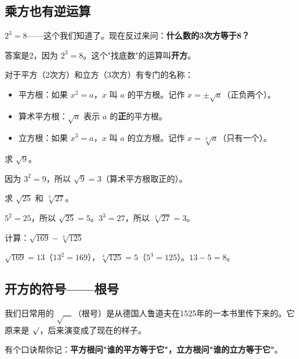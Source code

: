
\subsection*{乘方也有逆运算}

$2^3=8$——这个我们知道了。现在反过来问：\textbf{什么数的3次方等于8？}

答案是2，因为 $2^3=8$。这个"找底数"的运算叫\textbf{开方}。

对于平方（2次方）和立方（3次方）有专门的名称：

\begin{itemize}
  \item 平方根：如果 $x^2=a$，$x$ 叫 $a$ 的平方根。记作 $x=\pm\sqrt{a}$（正负两个）。
  \item 算术平方根：$\sqrt{a}$ 表示 $a$ 的\textbf{正}的平方根。
  \item 立方根：如果 $x^3=a$，$x$ 叫 $a$ 的立方根。记作 $x=\sqrt[3]{a}$（只有一个）。
\end{itemize}

\begin{example}
求 $\sqrt{9}$。
\end{example}
\begin{solution}
因为 $3^2=9$，所以 $\sqrt{9}=3$（算术平方根取正的）。
\end{solution}

\begin{example}
求 $\sqrt{25}$ 和 $\sqrt[3]{27}$。
\end{example}
\begin{solution}
$5^2=25$，所以 $\sqrt{25}=5$。$3^3=27$，所以 $\sqrt[3]{27}=3$。
\end{solution}

\begin{example}
计算：$\sqrt{169}-\sqrt[3]{125}$
\end{example}
\begin{solution}
$\sqrt{169}=13$（$13^2=169$），$\sqrt[3]{125}=5$（$5^3=125$）。$13-5=8$。
\end{solution}

\subsection*{开方的符号——根号}

我们日常用的 $\sqrt{\quad}$（根号）是从德国人鲁道夫在1525年的一本书里传下来的。它原来是 $\surd$，后来演变成了现在的样子。

有个口诀帮你记：\textbf{平方根问"谁的平方等于它"，立方根问"谁的立方等于它"}。

